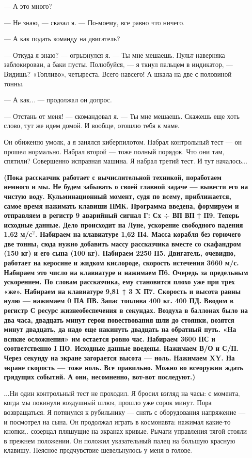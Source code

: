 \documentclass[11pt,a4paper,oneside]{article}
\begin{document}
— А это много?

— Не знаю, — сказал я. — По-моему, все равно что ничего.

— А как подать команду на двигатель?

— Откуда я знаю? — огрызнулся я. — Ты мне мешаешь. Пульт наверняка заблокирован, а баки пусты. Полюбуйся, — я ткнул пальцем в индикатор, — Видишь? «Топливо», четыреста. Всего-навсего! А шкала на две с половиной тонны.

— А как... — продолжал он допрос.

— Отстань от меня! — скомандовал я. — Ты мне мешаешь. Скажешь еще хоть слово, тут же идем домой. И вообще, отошлю тебя к маме.

Он обиженно умолк, а я занялся киберпилотом. Набрал контрольный тест — он прошел нормально. Набрал второй — тоже полный порядок. Что они там, спятили? Совершенно исправная машина. Я набрал третий тест. И тут началось...

\textbf{
(Пока рассказчик работает с вычислительной техникой, поработаем немного и мы. Не будем забывать о своей главной задаче — вывести его на чистую воду. Кульминационный момент, судя по всему, приближается, самое время нажимать клавиши ПМК. Программа введена, формируем и отправляем в регистр 9 аварийный сигнал Г: Сх ÷ ВП ВП ↑ П9. Теперь исходные данные. Дело происходит на Луне, ускорение свободного падения 1,62 м/c$^{2}$. Набираем на клавиатуре 1,62 П4. Масса корабля без горючего две тонны, сюда нужно добавить массу рассказчика вместе со скафандром (150 кг) и его сына (100 кг). Набираем 2250 П5. Двигатель, очевидно, работает на керосине и жидком кислороде, скорость истечения 3660 м/с. Набираем это число на клавиатуре и нажимаем П6. Очередь за предельным ускорением. По словам рассказчика, ему становится плохо уже при трех «же». Набираем на клавиатуре 9,81 ↑ 3 X П7. Скорость и высота равны нулю — нажимаем 0 ПА ПВ. Запас топлива 400 кг. 400 ПД. Вводим в регистр С ресурс жизнеобеспечения в секундах. Воздуха в баллонах было на два часа, двадцать минут герои повествования шли до стоянки, возятся минут двадцать, да надо еще накинуть двадцать на обратный путь. «На всякие осложнения» им остается ровно час. Набираем 3600 ПС и соответственно I ПО. Исходные данные введены. Нажимаем В/О и С/П. Через секунду на экране загорается высота — ноль. Нажимаем XY. На экране скорость — тоже ноль. Все правильно. Можно во всеоружии ждать грядущих событий. А они, несомненно, вот-вот последуют.)
}

...Ни один контрольный тест не проходил. Я бросил взгляд на часы: с момента, когда мы покинули воздушный шлюз, прошло уже сорок минут. Пора возвращаться. Я потянулся к рубильнику — снять с оборудования напряжение — и посмотрел на сына. Он продолжал играть в космонавта: нажимал какие-то кнопки,. созерцал пляшущие на экранах кривые. Рычаги управления тягой стояли в прежнем положении. Он положил указательный палец на большую красную клавишу. Неясное предчувствие шевельнулось у меня в голове.
\end{document}
